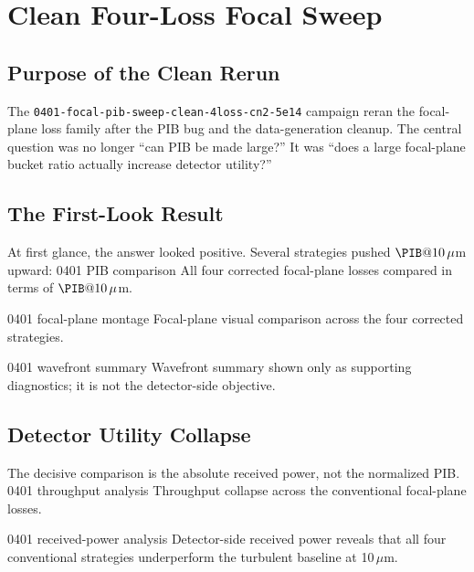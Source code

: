 \chapter{Clean Four-Loss Focal Sweep}

\section{Purpose of the Clean Rerun}

The \texttt{0401-focal-pib-sweep-clean-4loss-cn2-5e14} campaign reran the focal-plane
loss family after the PIB bug and the data-generation cleanup. The central
question was no longer ``can PIB be made large?'' It was ``does a large
focal-plane bucket ratio actually increase detector utility?''

\section{The First-Look Result}

At first glance, the answer looked positive. Several strategies pushed
$\PIB@10\,\mu$m upward:
  {0401 PIB comparison}
  {All four corrected focal-plane losses compared in terms of
  $\PIB@10\,\mu$m.}

  {0401 focal-plane montage}
  {Focal-plane visual comparison across the four corrected strategies.}

  {0401 wavefront summary}
  {Wavefront summary shown only as supporting diagnostics; it is not the
  detector-side objective.}

\section{Detector Utility Collapse}

The decisive comparison is the absolute received power, not the normalized PIB.
  {0401 throughput analysis}
  {Throughput collapse across the conventional focal-plane losses.}

  {0401 received-power analysis}
  {Detector-side received power reveals that all four conventional strategies
  underperform the turbulent baseline at 10\,$\mu$m.}

